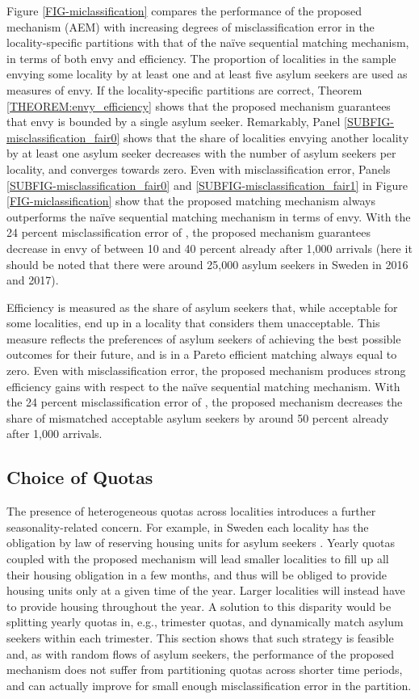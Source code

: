 \documentclass[12pt,fleqn]{article}
\begin{document}
Figure \ref{FIG-miclassification} compares the performance of the proposed mechanism (AEM) with increasing degrees of misclassification error in the locality-specific partitions with that of the na\"{i}ve sequential matching mechanism, in terms of both envy and efficiency. The proportion of localities in the sample envying some locality by at least one and at least five asylum seekers are used as measures of envy. If the locality-specific partitions are correct, Theorem \ref{THEOREM:envy_efficiency} shows that the proposed mechanism guarantees that envy is bounded by a single asylum seeker. Remarkably, Panel \ref{SUBFIG-misclassification_fair0} shows that the share of localities envying another locality by at least one asylum seeker decreases with the number of asylum seekers per locality, and converges towards zero. Even with misclassification error, Panels \ref{SUBFIG-misclassification_fair0} and \ref{SUBFIG-misclassification_fair1} in Figure \ref{FIG-miclassification} show that the proposed matching mechanism always outperforms the na\"{i}ve sequential matching mechanism in terms of envy. With the 24 percent misclassification error of \cite{bib:BansakEtAl}, the proposed mechanism guarantees decrease in envy of between 10 and 40 percent already after 1,000 arrivals (here it should be noted that there were around 25,000 asylum seekers in Sweden in 2016 and 2017).

Efficiency is measured as the share of asylum seekers that, while acceptable for some localities, end up in a locality that considers them unacceptable. This measure reflects the preferences of asylum seekers of achieving the best possible outcomes for their future, and is in a Pareto efficient matching always equal to zero. Even with misclassification error, the proposed mechanism produces strong efficiency gains with respect to the na\"{i}ve sequential matching mechanism. With the 24 percent misclassification error of \cite{bib:BansakEtAl}, the proposed mechanism decreases the share of mismatched acceptable asylum seekers by around 50 percent already after 1,000 arrivals.

\subsection{Choice of Quotas}\label{SEC:quotas}
The presence of heterogeneous quotas across localities introduces a further seasonality-related concern. For example, in Sweden each locality has the obligation by law of reserving housing units for asylum seekers \citep[Swedish Law,][]{SFS2016}. Yearly quotas coupled with the proposed mechanism will lead smaller localities to fill up all their housing obligation in a few months, and thus will be obliged to provide housing units only at a given time of the year. Larger localities will instead have to provide housing throughout the year. A solution to this disparity would be splitting yearly quotas in, e.g., trimester quotas, and dynamically match asylum seekers within each trimester. This section shows that such strategy is feasible and, as with random flows of asylum seekers, the performance of the proposed mechanism does not suffer from partitioning quotas across shorter time periods, and can actually improve for small enough misclassification error in the partition.
\end{document}
